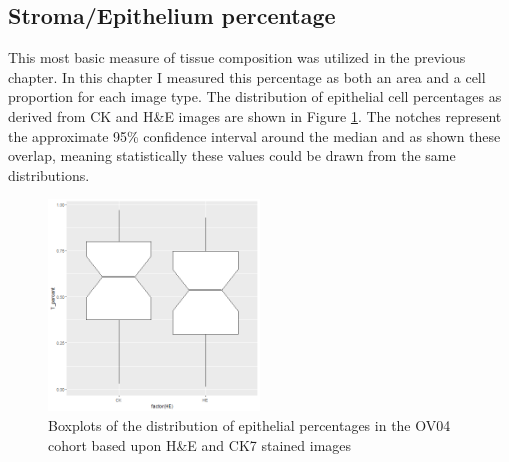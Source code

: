 \subsection{Stroma/Epithelium percentage}
This most basic measure of tissue composition was utilized in the previous chapter. In this chapter I measured this percentage as both an area and a cell proportion for each image type. The distribution of epithelial cell percentages as derived from CK and H\&E images are shown in Figure \ref{fig:epi_percent}. The notches represent the approximate 95\% confidence interval around the median and as shown these overlap, meaning statistically these values could be drawn from the same distributions. 

\begin{figure}
    \centering
    \includegraphics[width=0.5\textwidth]{Chapter3/Figs/boxplot_epithelium.png}
    \caption{Boxplots of the distribution of epithelial percentages in the OV04 cohort based upon H\&E and CK7 stained images}
    \label{fig:epi_percent}
\end{figure}

